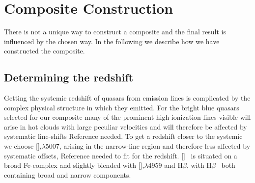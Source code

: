 \documentclass{aa}    %
\newcommand{\sectlabel}[1]{\label{sect:#1}}
\newcommand{\hb}{H$\beta$}
\newcommand{\oiii}{[\ion{O}{iii}]}
\begin{document}
\section{Composite Construction}   \sectlabel{construct}

There is not a unique way to construct a composite and the final result is influenced by the chosen way. In the following we describe how we have constructed the composite.

\subsection{Determining the redshift}  \sectlabel{redshifts}

Getting the systemic redshift of quasars from emission lines is complicated by the complex physical structure in which they emitted. For the bright blue quasars selected for our composite many of the prominent high-ionization lines visible will arise in hot clouds with large peculiar velocities and will therefore be affected by systematic line-shifts {\color{red} Reference needed}. To get a redshift closer to the systemic we choose \oiii,$\lambda$5007,  arising in the narrow-line region and therefore less affected by systematic offsets, {\color{red} Reference needed} to fit for the redshift. \oiii~ is situated on a broad Fe-complex and slightly blended with \oiii,$\lambda$4959 and \hb, with \hb~ both containing broad and narrow components. 
\end{document}
